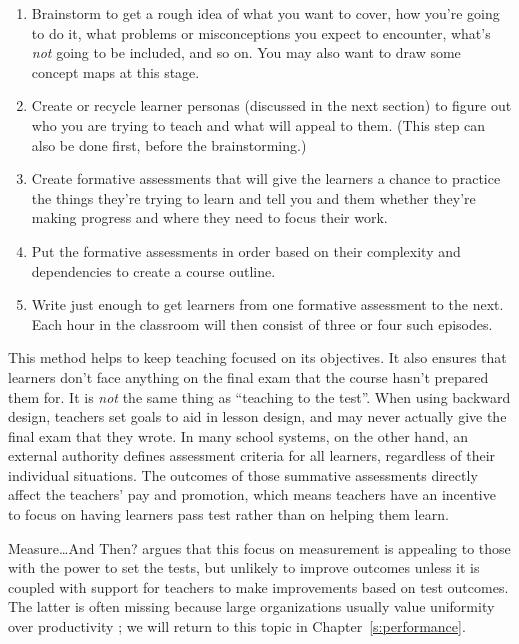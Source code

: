 \begin{enumerate}
\item
  Brainstorm to get a rough idea of what you want to cover, how
  you're going to do it, what problems or misconceptions you expect
  to encounter, what's \emph{not} going to be included, and so on. You may
  also want to draw some concept maps at this stage.
\item
  Create or recycle learner personas (discussed in the next section)
  to figure out who you are trying to teach and what will appeal to
  them. (This step can also be done first, before the brainstorming.)
\item
  Create formative assessments that will give the learners a chance
  to practice the things they're trying to learn and tell you and
  them whether they're making progress and where they need to focus
  their work.
\item
  Put the formative assessments in order based on their complexity
  and dependencies to create a course outline.
\item
  Write just enough to get learners from one formative assessment to
  the next. Each hour in the classroom will then consist of three or
  four such episodes.
\end{enumerate}

This method helps to keep teaching focused on its objectives. It also
ensures that learners don't face anything on the final exam that the
course hasn't prepared them for. It is \emph{not} the same thing as
``teaching to the test''. When using backward design, teachers set goals
to aid in lesson design, and may never actually give the final exam
that they wrote. In many school systems, on the other hand, an
external authority defines assessment criteria for all learners,
regardless of their individual situations. The outcomes of those
summative assessments directly affect the teachers' pay and promotion,
which means teachers have an incentive to focus on having learners
pass test rather than on helping them learn.

\begin{aside}{Measure{\ldots}And Then?}
  \cite{Gree2014} argues that this focus on measurement is
  appealing to those with the power to set the tests, but unlikely to
  improve outcomes unless it is coupled with support for teachers to
  make improvements based on test outcomes. The latter is often
  missing because large organizations usually value uniformity over
  productivity \cite{Scot1998}; we will return to this topic in
  Chapter~\ref{s:performance}.
\end{aside}

